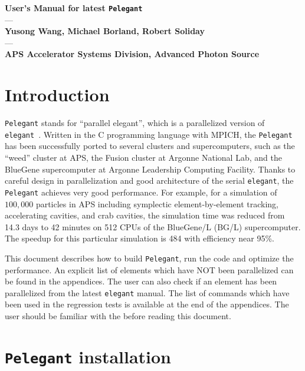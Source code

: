 \documentclass[11pt]{article}
\begin{document}
 
\begin{center}
    {\Large\bf User's Manual for latest {\tt Pelegant}}\\
    {---\\}
    {\bf Yusong Wang,  Michael Borland,  Robert Soliday\\}
    {---\\}
    {\bf APS Accelerator Systems Division, Advanced Photon Source\\}
\end{center}

\section{Introduction}

{\tt Pelegant} stands for ``parallel elegant'', which is a parallelized
version of {\tt elegant}~\cite{elegant}.  Written in the C programming
language with MPICH, the {\tt Pelegant} has been successfully ported to
several clusters and supercomputers, such as the ``weed'' cluster at APS, 
the Fusion cluster at Argonne National Lab, and the BlueGene supercomputer
 at  Argonne Leadership Computing Facility. Thanks to
careful design in parallelization and good architecture of the serial
{\tt elegant}, the {\tt Pelegant} achieves very good performance. For example, for a
simulation of $100,000$ particles in APS including symplectic
element-by-element tracking, accelerating cavities, and crab cavities,
the simulation time was reduced from 14.3 days to 42 minutes on 512
CPUs of the BlueGene/L (BG/L) supercomputer. The speedup for this
particular simulation is 484 with efficiency near 95\%.

This document describes how to build {\tt Pelegant}, run the code and
optimize the performance. An explicit list of elements which have NOT  been parallelized can be found in the appendices. The user can also check if an element has been parallelized
from the latest {\tt elegant} manual. 
The list of commands which  have been used in the regression tests is available at the end of the appendices.  
The user should be familiar with the   before reading this document.


\section{{\tt Pelegant} installation}
\end{document}
